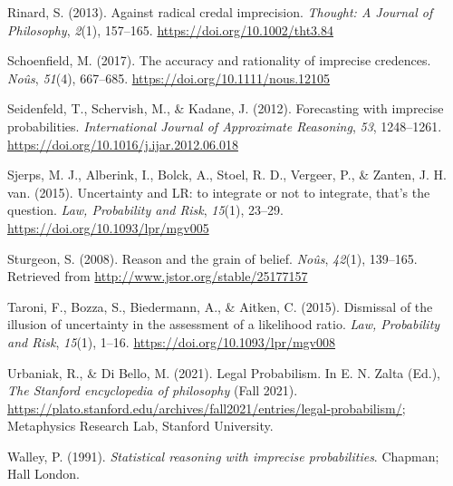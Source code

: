 \documentclass[
  10pt,
  dvipsnames,enabledeprecatedfontcommands]{scrartcl}
\newlength{\cslhangindent}
\newlength{\cslentryspacingunit} %
\newenvironment{CSLReferences}[2] %
 {%
  \setlength{\parindent}{0pt}
  \ifodd #1
  \let\oldpar\par
  \def\par{\hangindent=\cslhangindent\oldpar}
  \fi
  \setlength{\parskip}{#2\cslentryspacingunit}
 }%
 {}
\begin{document}
\begin{CSLReferences}{1}{0}
\leavevmode{}%
Rinard, S. (2013). Against radical credal imprecision. \emph{Thought: A
Journal of Philosophy}, \emph{2}(1), 157--165.
\url{https://doi.org/10.1002/tht3.84}

\leavevmode{}%
Schoenfield, M. (2017). The accuracy and rationality of imprecise
credences. \emph{Noûs}, \emph{51}(4), 667--685.
\url{https://doi.org/10.1111/nous.12105}

\leavevmode{}%
Seidenfeld, T., Schervish, M., \& Kadane, J. (2012). Forecasting with
imprecise probabilities. \emph{International Journal of Approximate
Reasoning}, \emph{53}, 1248--1261.
\url{https://doi.org/10.1016/j.ijar.2012.06.018}

\leavevmode{}%
Sjerps, M. J., Alberink, I., Bolck, A., Stoel, R. D., Vergeer, P., \&
Zanten, J. H. van. (2015). {Uncertainty and LR: to integrate or not to
integrate, that's the question}. \emph{Law, Probability and Risk},
\emph{15}(1), 23--29. \url{https://doi.org/10.1093/lpr/mgv005}

\leavevmode{}%
Sturgeon, S. (2008). Reason and the grain of belief. \emph{No{û}s},
\emph{42}(1), 139--165. Retrieved from
\url{http://www.jstor.org/stable/25177157}

\leavevmode{}%
Taroni, F., Bozza, S., Biedermann, A., \& Aitken, C. (2015). {Dismissal
of the illusion of uncertainty in the assessment of a likelihood ratio}.
\emph{Law, Probability and Risk}, \emph{15}(1), 1--16.
\url{https://doi.org/10.1093/lpr/mgv008}

\leavevmode{}%
Urbaniak, R., \& Di Bello, M. (2021). {Legal Probabilism}. In E. N.
Zalta (Ed.), \emph{The {Stanford} encyclopedia of philosophy} (Fall
2021).
\url{https://plato.stanford.edu/archives/fall2021/entries/legal-probabilism/};
Metaphysics Research Lab, Stanford University.

\leavevmode{}%
Walley, P. (1991). \emph{Statistical reasoning with imprecise
probabilities}. Chapman; Hall London.

\end{CSLReferences}
\end{document}
